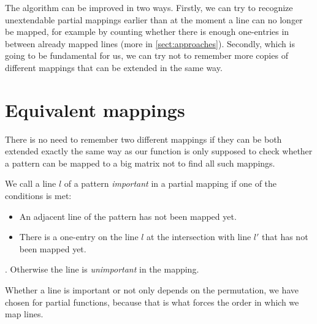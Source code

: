 The algorithm can be improved in two ways. Firstly, we can try to recognize unextendable partial mappings earlier than at the moment a line can no longer be mapped, for example by counting whether there is enough one-entries in between already mapped lines (more in \autoref{sect:approaches}). Secondly, which is going to be fundamental for us, we can try not to remember more copies of different mappings that can be extended in the same way.

\section{Equivalent mappings}
There is no need to remember two different mappings if they can be both extended exactly the same way as our function is only supposed to check whether a pattern can be mapped to a big matrix not to find all such mappings.
\begin{defn}
We call a line $l$ of a pattern \emph{important} in a partial mapping if one of the conditions is met:
\begin{itemize}
\item An adjacent line of the pattern has not been mapped yet.
\item There is a one-entry on the line $l$ at the intersection with line $l'$ that has not been mapped yet.
\end{itemize}.
Otherwise the line is \emph{unimportant} in the mapping.
\end{defn}
Whether a line is important or not only depends on the permutation, we have chosen for partial functions, because that is what forces the order in which we map lines.

